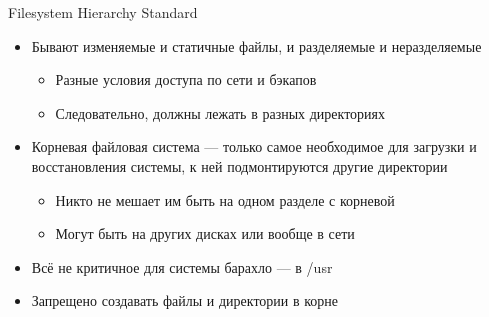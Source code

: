 \documentclass{../../slides-style}
\begin{document}
    \begin{frame}{Filesystem Hierarchy Standard}
        \begin{itemize}
            \item Бывают изменяемые и статичные файлы, и разделяемые и неразделяемые
            \begin{itemize}
                \item Разные условия доступа по сети и бэкапов
                \item Следовательно, должны лежать в разных директориях
            \end{itemize}
            \item Корневая файловая система --- только самое необходимое для загрузки и восстановления системы, к ней подмонтируются другие директории
            \begin{itemize}
                \item Никто не мешает им быть на одном разделе с корневой
                \item Могут быть на других дисках или вообще в сети
            \end{itemize}
            \item Всё не критичное для системы барахло --- в /usr
            \item Запрещено создавать файлы и директории в корне
        \end{itemize}
    \end{frame}
\end{document}
